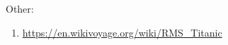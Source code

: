 \documentclass[notitlepage,a4paper,oneside,article,table]{article}
\begin{document}
Other: 
\begin{enumerate}
    \item \url{https://en.wikivoyage.org/wiki/RMS_Titanic}
    
\end{enumerate}


\iffalse 
Use this comment to keep track of references and work specific to this section


\fi

\iffalse 
\begin{figure}[h] %
    \centering
    \texttt{[image: ]}
    \caption{}
\end{figure}
\FloatBarrier
\fi
\end{document}
